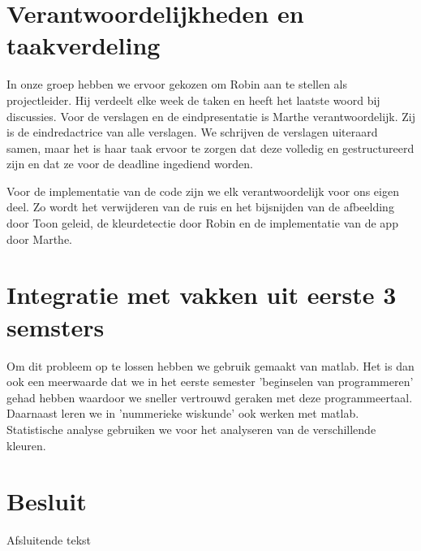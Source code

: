 \documentclass[a4paper,kulak]{kulakarticle}
\begin{document}
	\section{Verantwoordelijkheden en taakverdeling}		
		In onze groep hebben we ervoor gekozen om Robin aan te stellen als projectleider. Hij verdeelt elke week de taken en heeft het laatste woord bij discussies. 
		Voor de verslagen en de eindpresentatie is Marthe verantwoordelijk. Zij is de eindredactrice van alle verslagen. We schrijven de verslagen uiteraard samen, maar het is haar taak ervoor te zorgen dat deze volledig en gestructureerd zijn en dat ze voor de deadline ingediend worden. 
	
		Voor de implementatie van de code zijn we elk verantwoordelijk voor ons eigen deel. Zo wordt het verwijderen van de ruis en het bijsnijden van de afbeelding door Toon geleid, de kleurdetectie door Robin en de implementatie van de app door Marthe.
		
	\section{Integratie met vakken uit eerste 3 semsters}
		Om dit probleem op te lossen hebben we gebruik gemaakt van matlab. Het is dan ook een meerwaarde dat we in het eerste semester 'beginselen van programmeren' gehad hebben waardoor we sneller vertrouwd geraken met deze programmeertaal. Daarnaast leren we in 'nummerieke wiskunde' ook werken met matlab. Statistische analyse gebruiken we voor het analyseren van de verschillende kleuren.
	
	\section*{Besluit}	
		Afsluitende tekst
\end{document}
